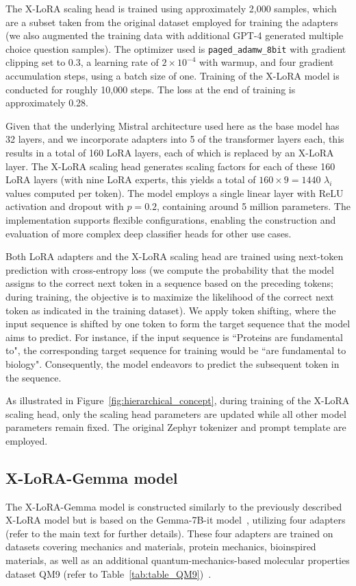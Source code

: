 The X-LoRA scaling head is trained using approximately 2,000 samples, which are a subset taken from the original dataset employed for training the adapters (we also augmented the training data with additional GPT-4 generated multiple choice question samples). The optimizer used is \texttt{paged\_adamw\_8bit} with gradient clipping set to 0.3, a learning rate of $2\times 10^{-4}$ with warmup, and four gradient accumulation steps, using a batch size of one. Training of the X-LoRA model is conducted for roughly 10,000 steps. The loss at the end of training is approximately 0.28.

Given that the underlying Mistral architecture used here as the base model has 32 layers, and we incorporate adapters into 5 of the transformer layers each, this results in a total of 160 LoRA layers, each of which is replaced by an X-LoRA layer. The X-LoRA scaling head generates scaling factors for each of these 160 LoRA layers (with nine LoRA experts, this yields a total of $160\times 9=1440$ $\lambda_i$ values computed per token). The model employs a single linear layer with ReLU activation and dropout with $p=0.2$, containing around 5 million parameters. The implementation supports flexible configurations, enabling the construction and evaluation of more complex deep classifier heads for other use cases.

Both LoRA adapters and the X-LoRA scaling head are trained using next-token prediction with cross-entropy loss (we compute the probability that the model assigns to the correct next token in a sequence based on the preceding tokens; during training, the objective is to maximize the likelihood of the correct next token as indicated in the training dataset). We apply token shifting, where the input sequence is shifted by one token to form the target sequence that the model aims to predict. For instance, if the input sequence is ``Proteins are fundamental to", the corresponding target sequence for training would be ``are fundamental to biology". Consequently, the model endeavors to predict the subsequent token in the sequence.

As illustrated in Figure~\ref{fig:hierarchical_concept}, during training of the X-LoRA scaling head, only the scaling head parameters are updated while all other model parameters remain fixed. The original Zephyr tokenizer and prompt template are employed.

\subsection{X-LoRA-Gemma model} The X-LoRA-Gemma model is constructed similarly to the previously described X-LoRA model but is based on the Gemma-7B-it model~\cite{Google/gemma-7b-itFace}, utilizing four adapters (refer to the main text for further details). These four adapters are trained on datasets covering mechanics and materials, protein mechanics, bioinspired materials, as well as an additional quantum-mechanics-based molecular properties dataset QM9 (refer to Table~\ref{tab:table_QM9})~\cite{Ruddigkeit2012EnumerationGDB-17,Ramakrishnan2015ElectronicSpace}.

